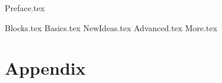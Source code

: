 \documentclass[
    twoside,
]{styles/mori-book}%
\begin{document}
    \maketitlepage

    \frontmatter
    \pagestyle{front}
    {Preface.tex}

    \maketocpage

    \mainmatter

    \pagestyle{main}

    {Blocks.tex}
    {Basics.tex}
    {NewIdeas.tex}
    {Advanced.tex}
    {More.tex}

    \setcounter{part}{4}

    \appendix
    \section{Appendix}

    \backmatter


    \lipsum[2-3]
    
\end{document}
